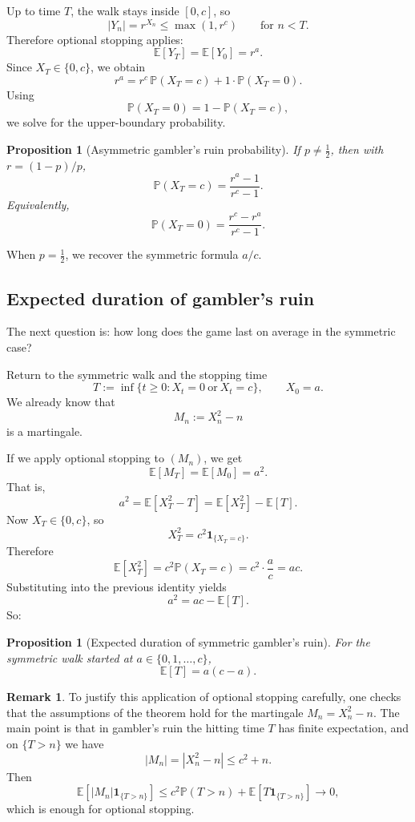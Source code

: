 \documentclass[11pt]{article}
\newtheorem{proposition}[theorem]{Proposition}
\theoremstyle{definition}
\newtheorem{remark}[theorem]{Remark}
\begin{document}
Up to time \(T\), the walk stays inside \([0,c]\), so
\[
|Y_n|=r^{X_n}\le \max(1,r^c)
\qquad \text{for } n<T.
\]
Therefore optional stopping applies:
\[
\mathbb E[Y_T]=\mathbb E[Y_0]=r^a.
\]
Since \(X_T\in\{0,c\}\), we obtain
\[
r^a=r^c\,\mathbb P(X_T=c)+1\cdot \mathbb P(X_T=0).
\]
Using
\[
\mathbb P(X_T=0)=1-\mathbb P(X_T=c),
\]
we solve for the upper-boundary probability.

\begin{proposition}[Asymmetric gambler's ruin probability]
If \(p\ne \tfrac12\), then with \(r=(1-p)/p\),
\[
\mathbb P(X_T=c)=\frac{r^a-1}{r^c-1}.
\]
Equivalently,
\[
\mathbb P(X_T=0)=\frac{r^c-r^a}{r^c-1}.
\]
\end{proposition}

When \(p=\tfrac12\), we recover the symmetric formula \(a/c\).

\subsection{Expected duration of gambler's ruin}

The next question is: how long does the game last on average in the symmetric case?

Return to the symmetric walk and the stopping time
\[
T:=\inf\{t\ge 0:X_t=0\ \text{or}\ X_t=c\},
\qquad X_0=a.
\]
We already know that
\[
M_n:=X_n^2-n
\]
is a martingale.

If we apply optional stopping to \((M_n)\), we get
\[
\mathbb E[M_T]=\mathbb E[M_0]=a^2.
\]
That is,
\[
a^2=\mathbb E[X_T^2-T]=\mathbb E[X_T^2]-\mathbb E[T].
\]
Now \(X_T\in\{0,c\}\), so
\[
X_T^2=c^2\mathbf 1_{\{X_T=c\}}.
\]
Therefore
\[
\mathbb E[X_T^2]=c^2\mathbb P(X_T=c)=c^2\cdot \frac{a}{c}=ac.
\]
Substituting into the previous identity yields
\[
a^2=ac-\mathbb E[T].
\]
So:

\begin{proposition}[Expected duration of symmetric gambler's ruin]
For the symmetric walk started at \(a\in\{0,1,\dots,c\}\),
\[
\mathbb E[T]=a(c-a).
\]
\end{proposition}

\begin{remark}
To justify this application of optional stopping carefully, one checks that the assumptions of the theorem hold for the martingale \(M_n=X_n^2-n\). The main point is that in gambler's ruin the hitting time \(T\) has finite expectation, and on \(\{T>n\}\) we have
\[
|M_n|=|X_n^2-n|\le c^2+n.
\]
Then
\[
\mathbb E[|M_n|\mathbf 1_{\{T>n\}}]
\le
c^2\mathbb P(T>n)+\mathbb E[T\mathbf 1_{\{T>n\}}]\to 0,
\]
which is enough for optional stopping.
\end{remark}
\end{document}
